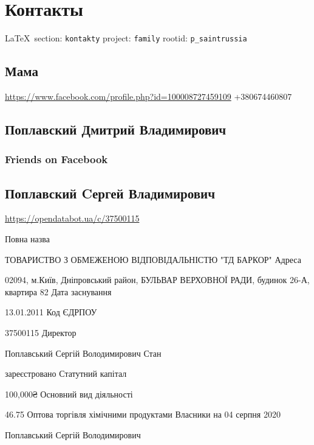  
 
\section{Контакты}

\vspace{0.5cm}
 {\ifDEBUG\small\LaTeX~section: \verb|kontakty| project: \verb|family| rootid: \verb|p_saintrussia| \fi}
\vspace{0.5cm}

\subsection{Мама}
\url{https://www.facebook.com/profile.php?id=100008727459109}
+380674460807



\subsection{Поплавский Дмитрий Владимирович}

\subsubsection{Friends on Facebook}

\subsection{Поплавский Cергей Владимирович}

\url{https://opendatabot.ua/c/37500115}

Повна назва

ТОВАРИСТВО З ОБМЕЖЕНОЮ ВІДПОВІДАЛЬНІСТЮ "ТД БАРКОР"
Адреса

02094, м.Київ, Дніпровський район, БУЛЬВАР ВЕРХОВНОЇ РАДИ, будинок 26-А, квартира 82
Дата заснування

13.01.2011
Код ЄДРПОУ

37500115
Директор

Поплавський Сергій Володимирович
Стан

зареєстровано
Статутний капітал

100,000₴
Основний вид діяльності

46.75 Оптова торгівля хімічними продуктами
Власники на 04 серпня 2020

Поплавський Сергій Володимирович

